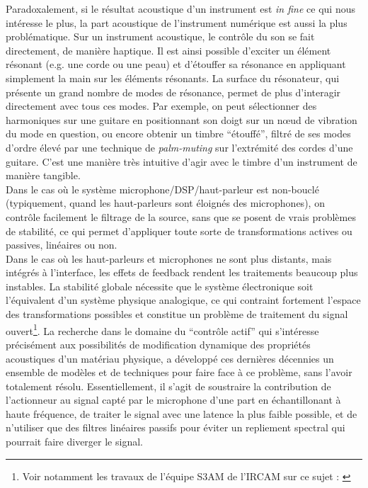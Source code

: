 \noindent Paradoxalement, si le résultat acoustique d'un instrument est \textit{in fine} ce qui nous intéresse le plus, la part acoustique de l'instrument numérique est aussi la plus problématique. Sur un instrument acoustique, le contrôle du son se fait directement, de manière haptique. Il est ainsi possible d'exciter un élément résonant (e.g. une corde ou une peau) et d'étouffer sa résonance en appliquant simplement la main sur les éléments résonants. La surface du résonateur, qui présente un grand nombre de modes de résonance, permet de plus d'interagir directement avec tous ces modes. Par exemple, on peut sélectionner des harmoniques sur une guitare en positionnant son doigt sur un nœud de vibration du mode en question, ou encore obtenir un timbre ``étouffé'', filtré de ses modes d'ordre élevé par une technique de \textit{palm-muting} sur l'extrémité des cordes d'une guitare. C'est une manière très intuitive d'agir avec le timbre d'un instrument de manière tangible.\\
\indent Dans le cas où le système microphone/DSP/haut-parleur est non-bouclé (typiquement, quand les haut-parleurs sont éloignés des microphones), on contrôle facilement le filtrage de la source, sans que se posent de vrais problèmes de stabilité, ce qui permet d'appliquer toute sorte de transformations actives ou passives, linéaires ou non.\\
\indent Dans le cas où les haut-parleurs et microphones ne sont plus distants, mais intégrés à l'interface, les effets de feedback rendent les traitements beaucoup plus instables. La stabilité globale nécessite que le système électronique soit l'équivalent d'un système physique analogique\cite{berdahl_feedback_2012}, ce qui contraint fortement l'espace des transformations possibles et constitue un problème de traitement du signal ouvert\footnote{Voir notamment les travaux de l'équipe S3AM de l'\gls{IRCAM} sur ce sujet : \cite{muller_power-balanced_2018, falaize_modelisation_2014, muller_minimal_2019}}. La recherche dans le domaine du ``contrôle actif'' qui s'intéresse précisément aux possibilités de modification dynamique des propriétés acoustiques d'un matériau physique, a développé ces dernières décennies un ensemble de modèles \cite{boutin_active_2011, benacchio_mode_2015, meurisse_active_2015, pardue_separating_2019} et de techniques pour faire face à ce problème, sans l'avoir totalement résolu. Essentiellement, il s'agit de soustraire la contribution de l'actionneur au signal capté par le microphone d'une part en échantillonant à haute fréquence, de traiter le signal avec une latence la plus faible possible, et de n'utiliser que des filtres linéaires passifs pour éviter un repliement spectral qui pourrait faire diverger le signal.\\
